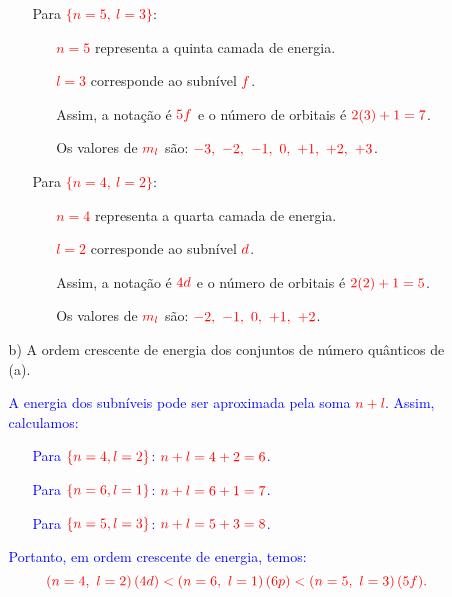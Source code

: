 \documentclass[a4paper, 12pt]{article}
\begin{document}
\begin{enumerate}
\begin{enumerate}
{\begin{itemize}
\begin{itemize}
				                  \end{itemize}
				            \item[] Para \textcolor{red}{\(\{n = 5,\ l = 3\}\)}:
				                  \begin{itemize}
					                  \item[] \textcolor{red}{\(n = 5\)} representa a quinta camada de energia.
					                  \item[] \textcolor{red}{\(l = 3\)} corresponde ao subnível \(\textcolor{red}{f}\).
					                  \item[] Assim, a notação é \(\textcolor{red}{5f}\) e o número de orbitais é \(\textcolor{red}{2(3)+1 = 7}\).
					                  \item[] Os valores de \(\textcolor{red}{m_l}\) são: \(\textcolor{red}{-3,\ -2,\ -1,\ 0,\ +1,\ +2,\ +3}\).
				                  \end{itemize}
				            \item[] Para \textcolor{red}{\(\{n = 4,\ l = 2\}\)}:
				                  \begin{itemize}
					                  \item[] \textcolor{red}{\(n = 4\)} representa a quarta camada de energia.
					                  \item[] \textcolor{red}{\(l = 2\)} corresponde ao subnível \(\textcolor{red}{d}\).
					                  \item[] Assim, a notação é \(\textcolor{red}{4d}\) e o número de orbitais é \(\textcolor{red}{2(2)+1 = 5}\).
					                  \item[] Os valores de \(\textcolor{red}{m_l}\) são: \(\textcolor{red}{-2,\ -1,\ 0,\ +1,\ +2}\).
				                  \end{itemize}
			            \end{itemize}
		            }
		            \pagebreak       
		      \item[b)] A ordem crescente de energia dos conjuntos de número quânticos de (a).
		            \\[10pt]
		            \textcolor{blue}{
			            A energia dos subníveis pode ser aproximada pela soma \textcolor{red}{\(n + l\)}. Assim, calculamos:
			            \begin{itemize}
				            \item[] Para \(\textcolor{red}{\{n = 4, l = 2\}}\): \(\textcolor{red}{n + l = 4 + 2 = 6}\).
				            \item[] Para \(\textcolor{red}{\{n = 6, l = 1\}}\): \(\textcolor{red}{n + l = 6 + 1 = 7}\).
				            \item[] Para \(\textcolor{red}{\{n = 5, l = 3\}}\): \(\textcolor{red}{n + l = 5 + 3 = 8}\).
			            \end{itemize}
			            \textcolor{blue}{Portanto, em ordem crescente de energia, temos:}
			            \[
				            \textcolor{red}{(n = 4,\ l = 2) \, (4d) < (n = 6,\ l = 1) \, (6p) < (n = 5,\ l = 3) \, (5f).}
			            \]
		            }
	      \end{enumerate}
	      

\end{enumerate}
\end{document}
